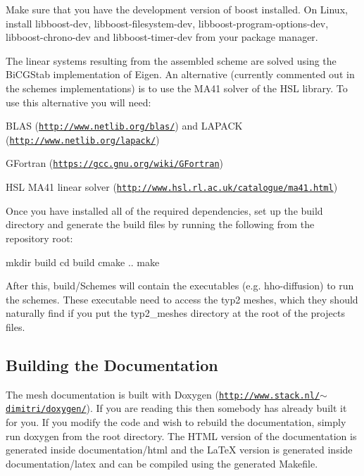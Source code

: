 Make sure that you have the development version of boost installed. On Linux, install {\ttfamily libboost-\/dev}, {\ttfamily libboost-\/filesystem-\/dev}, {\ttfamily libboost-\/program-\/options-\/dev}, {\ttfamily libboost-\/chrono-\/dev} and {\ttfamily libboost-\/timer-\/dev} from your package manager.

The linear systems resulting from the assembled scheme are solved using the Bi\+C\+G\+Stab implementation of Eigen. An alternative (currently commented out in the schemes\textquotesingle{} implementations) is to use the M\+A41 solver of the H\+SL library. To use this alternative you will need\+:


\begin{DoxyItemize}
\item B\+L\+AS (\href{http://www.netlib.org/blas/}{\tt http\+://www.\+netlib.\+org/blas/}) and L\+A\+P\+A\+CK (\href{http://www.netlib.org/lapack/}{\tt http\+://www.\+netlib.\+org/lapack/})
\item G\+Fortran (\href{https://gcc.gnu.org/wiki/GFortran}{\tt https\+://gcc.\+gnu.\+org/wiki/\+G\+Fortran})
\item H\+SL M\+A41 linear solver (\href{http://www.hsl.rl.ac.uk/catalogue/ma41.html}{\tt http\+://www.\+hsl.\+rl.\+ac.\+uk/catalogue/ma41.\+html})
\end{DoxyItemize}

Once you have installed all of the required dependencies, set up the build directory and generate the build files by running the following from the repository root\+:


\begin{DoxyCode}
mkdir build
cd build
cmake ..
make
\end{DoxyCode}


After this, {\ttfamily build/\+Schemes} will contain the executables (e.\+g. {\ttfamily hho-\/diffusion}) to run the schemes. These executable need to access the typ2 meshes, which they should naturally find if you put the {\ttfamily typ2\+\_\+meshes} directory at the root of the project\textquotesingle{}s files.\hypertarget{index_doco}{}\subsection{Building the Documentation}\label{index_doco}
The mesh documentation is built with Doxygen (\href{http://www.stack.nl/~dimitri/doxygen/}{\tt http\+://www.\+stack.\+nl/$\sim$dimitri/doxygen/}). If you are reading this then somebody has already built it for you. If you modify the code and wish to rebuild the documentation, simply run {\ttfamily doxygen} from the root directory. The H\+T\+ML version of the documentation is generated inside {\ttfamily documentation/html} and the La\+TeX version is generated inside {\ttfamily documentation/latex} and can be compiled using the generated Makefile.

